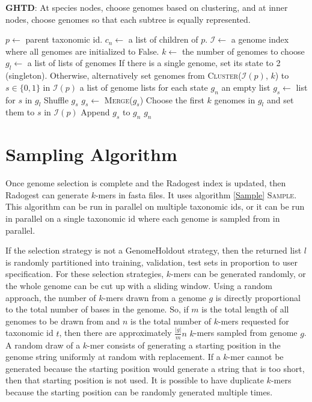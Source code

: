 \documentclass[12pt, letterpaper]{article}
\begin{document}
\begin{algorithm}[h!]
\caption{\textbf{GHTD}: At species nodes, choose genomes based on clustering, and at inner nodes, choose genomes so that each subtree is equally represented.}
\label{GHTD}
\begin{algorithmic}
\State $p \gets$ parent taxonomic id.
\State $c_n \gets$ a list of children of $p$.
\State $\mathcal{I} \gets$ a genome index where all genomes are initialized to False.
\State $k \gets$ the number of genomes to choose
\State $g_l \gets$ a list of lists of genomes
 
\State If there is a single genome, set its state to 2 (singleton).
\State Otherwise, alternatively set genomes from \textsc{Cluster}($\mathcal{I}(p)$, $k$) to $s \in \{0, 1\}$ in $\mathcal{I}(p)$
\State \Return a list of genome lists for each state 
\Else {}
\State $g_n$ an empty list
\State $g_s \gets$ list for $s$ in $g_l$
\State Shuffle $g_s$
\State $g_s \gets$ \textsc{Merge}($g_s$)
\State Choose the first $k$ genomes in $g_l$ and set them to $s$ in  $\mathcal{I}(p)$
\State Append $g_s$ to $g_n$
\EndFor
\State \Return $g_n$
\EndIf
\EndProcedure
\end{algorithmic}
\end{algorithm}

\newpage

\section{Sampling Algorithm}
Once genome selection is complete and the Radogest index is updated, then Radogest can generate $k$-mers in fasta files.  It uses algorithm \ref{Sample} \textsc{Sample}.  This algorithm can be run in parallel on multiple taxonomic ids, or it can be run in parallel on a single taxonomic id where each genome is sampled from in parallel.  

If the selection strategy is not a GenomeHoldout strategy, then the returned list $l$ is randomly partitioned into training, validation, test sets in proportion to user specification.  For these selection strategies, $k$-mers can be generated randomly, or the whole genome can be cut up with a sliding window.  Using a random approach, the number of $k$-mers drawn from a genome $g$ is directly proportional to the total number of bases in the genome.  So, if $m$ is the total length of all genomes to be drawn from and $n$ is the total number of $k$-mers requested for taxonomic id $t$, then there are approximately $\frac{|g|}{m}n$ $k$-mers sampled from genome $g$.  A random draw of a $k$-mer consists of generating a starting position in the genome string uniformly at random with replacement.  If a $k$-mer cannot be generated because the starting position would generate a string that is too short, then that starting position is not used.  It is possible to have duplicate $k$-mers because the starting position can be randomly generated multiple times.  
\end{document}
